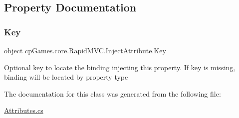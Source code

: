 \subsection{Property Documentation}
\mbox{\label{classcp_games_1_1core_1_1_rapid_m_v_c_1_1_inject_attribute_a31cad4210e35805fc8443756c8e268e1}} 
\subsubsection{\texorpdfstring{Key}{Key}}
{\footnotesize\ttfamily object cp\+Games.\+core.\+Rapid\+M\+V\+C.\+Inject\+Attribute.\+Key\hspace{0.3cm}{\ttfamily [get]}}



Optional key to locate the binding injecting this property. If key is missing, binding will be located by property type 



The documentation for this class was generated from the following file\+:\begin{DoxyCompactItemize}
\item 
\mbox{\hyperlink{_attributes_8cs}{Attributes.\+cs}}\end{DoxyCompactItemize}
